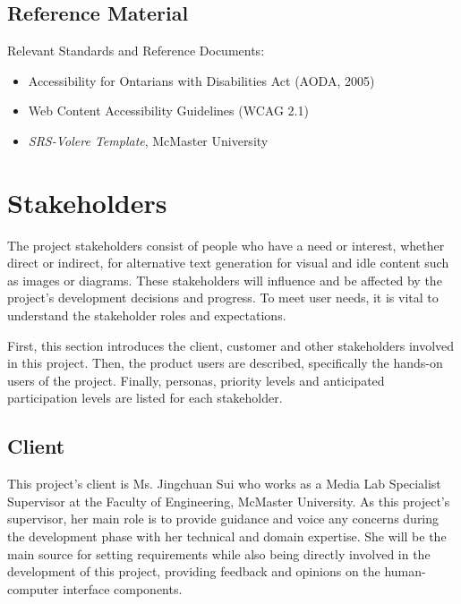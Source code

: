 \documentclass[12pt]{article}
\begin{document}
\subsection{Reference Material}
Relevant Standards and Reference Documents:
\begin{itemize}
  \item Accessibility for Ontarians with Disabilities Act (AODA, 2005)
  \item Web Content Accessibility Guidelines (WCAG 2.1)
  \item \textit{SRS-Volere Template}, McMaster University
\end{itemize}

\section{Stakeholders}
The project stakeholders consist of people who have a need or
interest, whether direct or indirect, for alternative text generation
for visual and idle
content such as images or diagrams. These stakeholders will
influence and be affected by the
project's development decisions and progress. To meet user
needs, it is vital to understand the stakeholder roles and expectations.
\par First, this section introduces the client, customer and other
stakeholders involved in this project. Then, the product users are
described, specifically the hands-on users of the project. Finally,
personas, priority levels and anticipated
participation levels are listed for each stakeholder.
\subsection{Client}
This project's client is Ms. Jingchuan Sui who works as a Media Lab
Specialist Supervisor at the Faculty of Engineering, McMaster
University. As this project's supervisor, her main role is to provide
guidance and voice any concerns during the development phase with her
technical and domain expertise. She will be the main source for
setting requirements while also being directly involved in the
development of this project, providing feedback and opinions on the
human-computer interface components.
\end{document}
